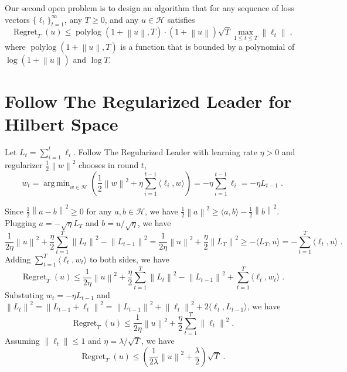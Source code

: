 \documentclass{colt2016} %
\DeclareMathOperator{\Regret}{Regret}
\DeclareMathOperator{\polylog}{polylog}
\renewcommand{\H}{\mathcal{H}}  %
\newcommand{\norm}[1]{\left\|{#1}\right\|}
\DeclareMathOperator*{\argmin}{arg\,min}
\begin{document}
Our second open problem is to design an algorithm that for any
sequence of loss vectors $\{\ell_t\}_{t=1}^\infty$, any $T \ge 0$,
and any $u \in \H$ satisfies
$$
\Regret_T(u) \le \polylog(1 + \norm{u}, T) \cdot (1 + \norm{u}) \sqrt{T} \max_{1 \le t \le T} \norm{\ell_t} \; ,
$$
where $\polylog(1 + \norm{u}, T)$ is a function that is bounded by a polynomial
of $\log(1 + \norm{u})$ and $\log T$.



\appendix

\section{Follow The Regularized Leader for Hilbert Space}

Let $L_t = \sum_{i=1}^t \ell_i$.
Follow The Regularized Leader with learning rate $\eta > 0$ and regularizer $\frac{1}{2}\norm{w}^2$
chooses in round $t$,
$$
w_t
= \argmin_{w \in \H} \left( \frac{1}{2}\norm{w}^2 + \eta \sum_{i=1}^{t-1} \langle \ell_i, w \rangle \right)
= - \eta \sum_{i=1}^{t-1} \ell_i = - \eta L_{t-1} \; .
$$

Since $\frac{1}{2}\norm{a-b}^2 \ge 0$ for any $a,b \in \H$, we have $\frac{1}{2}\norm{a}^2 \ge \langle a, b \rangle - \frac{1}{2}\norm{b}^2$.
Plugging $a = -\sqrt{\eta} L_T$ and $b = u/\sqrt{\eta}$, we have
$$
\frac{1}{2\eta} \norm{u}^2 + \frac{\eta}{2} \sum_{t=1}^T \norm{L_t}^2 - \norm{L_{t-1}}^2
= \frac{1}{2\eta} \norm{u}^2 + \frac{\eta}{2} \norm{L_T}^2  \ge - \langle L_T, u \rangle
= - \sum_{t=1}^T \langle \ell_t, u \rangle  \; .
$$
Adding $\sum_{t=1}^T \langle \ell_t, w_t \rangle$ to both sides, we have
$$
\Regret_T(u) \le \frac{1}{2\eta} \norm{u}^2 + \frac{\eta}{2} \sum_{t=1}^T \norm{L_t}^2 - \norm{L_{t-1}}^2 + \sum_{t=1}^T \langle \ell_t, w_t \rangle \; .
$$
Substuting $w_t = -\eta L_{t-1}$ and $\norm{L_{t}}^2 = \norm{L_{t-1} + \ell_t}^2 = \norm{L_{t-1}}^2 + \norm{\ell_t}^2 + 2 \langle \ell_t, L_{t-1} \rangle$,
we have
$$
\Regret_T(u) \le \frac{1}{2\eta} \norm{u}^2 + \frac{\eta}{2} \sum_{t=1}^T \norm{\ell_t}^2 \; .
$$
Assuming $\norm{\ell_t} \le 1$ and $\eta = \lambda/\sqrt{T}$, we have
$$
\Regret_T(u) \le \left(\frac{1}{2\lambda} \norm{u}^2 + \frac{\lambda}{2} \right) \sqrt{T} \; .
$$
\end{document}
